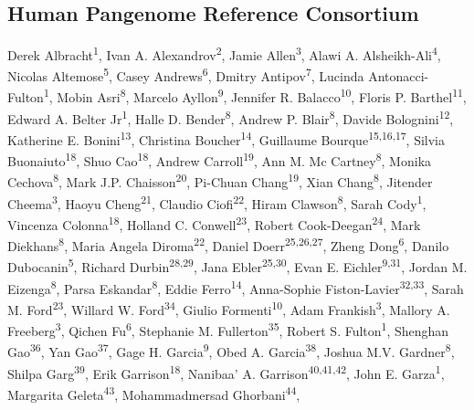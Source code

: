 \documentclass[pdflatex,mathphys]{jnl}
\begin{document}
\subsection*{Human Pangenome Reference Consortium}
{\small
\noindent Derek Albracht\textsuperscript{1}, Ivan A. Alexandrov\textsuperscript{2},
Jamie Allen\textsuperscript{3}, Alawi A. Alsheikh-Ali\textsuperscript{4},
Nicolas Altemose\textsuperscript{5}, Casey Andrews\textsuperscript{6},
Dmitry Antipov\textsuperscript{7}, Lucinda Antonacci-Fulton\textsuperscript{1},
Mobin Asri\textsuperscript{8}, Marcelo Ayllon\textsuperscript{9},
Jennifer R. Balacco\textsuperscript{10}, Floris P. Barthel\textsuperscript{11},
Edward A. Belter Jr\textsuperscript{1}, Halle D. Bender\textsuperscript{8},
Andrew P. Blair\textsuperscript{8}, Davide Bolognini\textsuperscript{12},
Katherine E. Bonini\textsuperscript{13}, Christina Boucher\textsuperscript{14},
Guillaume Bourque\textsuperscript{15,16,17}, Silvia Buonaiuto\textsuperscript{18},
Shuo Cao\textsuperscript{18}, Andrew Carroll\textsuperscript{19}, Ann M. Mc Cartney\textsuperscript{8},
Monika Cechova\textsuperscript{8}, Mark J.P. Chaisson\textsuperscript{20},
Pi-Chuan Chang\textsuperscript{19}, Xian Chang\textsuperscript{8}, Jitender Cheema\textsuperscript{3},
Haoyu Cheng\textsuperscript{21}, Claudio Ciofi\textsuperscript{22}, Hiram Clawson\textsuperscript{8},
Sarah Cody\textsuperscript{1}, Vincenza Colonna\textsuperscript{18},
Holland C. Conwell\textsuperscript{23}, Robert Cook-Deegan\textsuperscript{24},
Mark Diekhans\textsuperscript{8}, Maria Angela Diroma\textsuperscript{22},
Daniel Doerr\textsuperscript{25,26,27}, Zheng Dong\textsuperscript{6},
Danilo Dubocanin\textsuperscript{5}, Richard Durbin\textsuperscript{28,29},
Jana Ebler\textsuperscript{25,30}, Evan E. Eichler\textsuperscript{9,31},
Jordan M. Eizenga\textsuperscript{8}, Parsa Eskandar\textsuperscript{8},
Eddie Ferro\textsuperscript{14}, Anna-Sophie Fiston-Lavier\textsuperscript{32,33},
Sarah M. Ford\textsuperscript{23}, Willard W. Ford\textsuperscript{34},
Giulio Formenti\textsuperscript{10}, Adam Frankish\textsuperscript{3},
Mallory A. Freeberg\textsuperscript{3}, Qichen Fu\textsuperscript{6},
Stephanie M. Fullerton\textsuperscript{35}, Robert S. Fulton\textsuperscript{1},
Shenghan Gao\textsuperscript{36}, Yan Gao\textsuperscript{37}, Gage H. Garcia\textsuperscript{9},
Obed A. Garcia\textsuperscript{38}, Joshua M.V. Gardner\textsuperscript{8},
Shilpa Garg\textsuperscript{39}, Erik Garrison\textsuperscript{18},
Nanibaa' A. Garrison\textsuperscript{40,41,42}, John E. Garza\textsuperscript{1},
Margarita Geleta\textsuperscript{43}, Mohammadmersad Ghorbani\textsuperscript{44},
}
\end{document}
